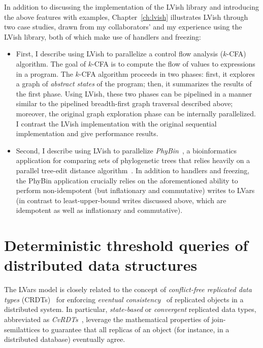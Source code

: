 In addition to discussing the implementation of the LVish library and
introducing the above features with examples, Chapter~\ref{ch:lvish}
illustrates LVish through two case studies, drawn from my
collaborators' and my experience using the LVish library, both of which
make use of handlers and freezing:
\begin{itemize}
\item First, I describe using LVish to parallelize a control flow
  analysis ($k$-CFA) algorithm.  The goal of $k$-CFA is to compute the
  flow of values to expressions in a program.  The $k$-CFA algorithm
  proceeds in two phases: first, it explores a graph of \emph{abstract
    states} of the program; then, it summarizes the results of the
  first phase.  Using LVish, these two phases can be pipelined in a
  manner similar to the pipelined breadth-first graph traversal
  described above; moreover, the original graph exploration phase can
  be internally parallelized.  I contrast the LVish implementation
  with the original sequential implementation and give performance
  results.
\item Second, I describe using LVish to parallelize
  \emph{PhyBin}~\cite{PhyBin}, a bioinformatics application for
  comparing sets of phylogenetic trees that relies heavily on a
  parallel tree-edit distance algorithm~\cite{hashrf}.  In addition to
  handlers and freezing, the PhyBin application crucially relies on
  the aforementioned ability to perform non-idempotent (but
  inflationary and commutative) writes to LVars (in contrast to
  least-upper-bound writes discussed above, which are idempotent as
  well as inflationary and commutative).
\end{itemize}

\section{Deterministic threshold queries of distributed data structures}\label{s:intro-cvrdts}

The LVars model is closely related to the concept of
\emph{conflict-free replicated data types} (CRDTs)~\cite{crdts} for
enforcing \emph{eventual consistency}~\cite{vogels-ec} of replicated
objects in a distributed system.  In particular, \emph{state-based} or
\emph{convergent} replicated data types, abbreviated as
\emph{CvRDTs}~\cite{crdts, crdts-tr}, leverage the mathematical
properties of join-semilattices to guarantee that all replicas of an
object (for instance, in a distributed database) eventually agree.

